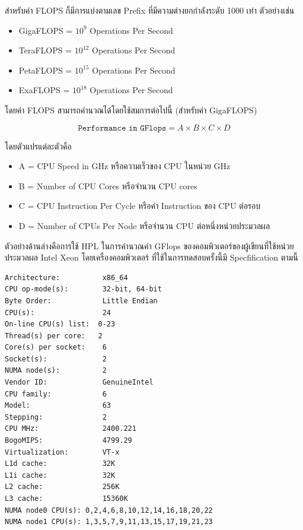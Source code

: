 สำหรับค่า FLOPS ก็มีการแบ่งตามเลข Prefix ที่มีความต่างยกกำลังระดับ 1000 เท่า ตัวอย่างเช่น

\begin{itemize}[topsep=0pt,noitemsep]
  \setlength\itemsep{1em}
  \item GigaFLOPS = $10^{9}$ Operations Per Second

  \item TeraFLOPS = $10^{12}$ Operations Per Second

  \item PetaFLOPS = $10^{15}$ Operations Per Second

  \item ExaFLOPS = $10^{18}$ Operations Per Second
\end{itemize}

\noindent โดยค่า FLOPS สามารถคำนวณได้โดยใช้สมการต่อไปนี้ (สำหรับค่า GigaFLOPS)

\begin{equation}
  \texttt{Performance in GFlops} = A \times B \times C \times D
\end{equation}

\noindent โดยตัวแปรแต่ละตัวคือ

\begin{itemize}[topsep=0pt,noitemsep]
  \setlength\itemsep{1em}
  \item A = CPU Speed in GHz หรือความเร็วของ CPU ในหน่วย GHz

  \item B = Number of CPU Cores หรือจำนวน CPU cores

  \item C = CPU Instruction Per Cycle หรือค่า Instruction ของ CPU ต่อรอบ

  \item D = Number of CPUs Per Node หรือจำนวน CPU ต่อหนึ่งหน่วยประมวลผล
\end{itemize}

ตัวอย่างด้านล่างคือการใช้ HPL ในการคำนวณค่า GFlops ของคอมพิวเตอร์ของผู้เขียนที่ใช้หน่วยประมวลผล Intel Xeon โดยเครื่องคอมพิวเตอร์%
ที่ใช้ในการทดสอบครั้งนี้มี Specfification ตามนี้

\vspace{5pt}

\begin{lstlisting}[basicstyle=\ttfamily\footnotesize\linespread{0.5}]
Architecture:          x86_64
CPU op-mode(s):        32-bit, 64-bit
Byte Order:            Little Endian
CPU(s):                24
On-line CPU(s) list:  0-23
Thread(s) per core:   2
Core(s) per socket:    6
Socket(s):             2
NUMA node(s):          2
Vendor ID:             GenuineIntel
CPU family:            6
Model:                 63
Stepping:              2
CPU MHz:               2400.221
BogoMIPS:              4799.29
Virtualization:        VT-x
L1d cache:             32K
L1i cache:             32K
L2 cache:              256K
L3 cache:              15360K
NUMA node0 CPU(s): 0,2,4,6,8,10,12,14,16,18,20,22
NUMA node1 CPU(s): 1,3,5,7,9,11,13,15,17,19,21,23
\end{lstlisting}

